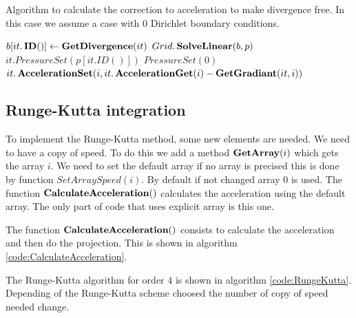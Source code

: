 \begin{algorithm}
\caption{Algorithm to calculate the correction to acceleration to make divergence free.
In this case we assume a case with 0 Dirichlet boundary conditions.}
\label{code:ProjectAcceleration}
\begin{algorithmic}[1]
				\State $b[it.\mathop{\textbf{ID}}()] \gets \mathop{\textbf{GetDivergence}}(it)$
			\EndIf
		\EndFor
		\State $Grid.\mathop{\textbf{SolveLinear}}(b,p)$
				\State $it.PressureSet(p[it.ID()])$
			\Else
				\State $PressureSet(0)$
			\EndIf
		\EndFor
				\State $it.\mathop{\textbf{AccelerationSet}}(i,it.\mathop{\textbf{AccelerationGet}}(i)-\mathop{\textbf{GetGradiant}}(it,i))$
			\EndFor
		\EndFor
\EndProcedure
			 \end{algorithmic}
\end{algorithm}

\subsection{Runge-Kutta integration}
\label{fixed:sec:rungekutta}

To implement the Runge-Kutta method, some new elements are needed.
We need to have a copy of speed. To do this we add a method $\mathop{\textbf{GetArray}}(i)$ which gets the array $i$.
We need to set the default array if no array is precised this is done by function $SetArraySpeed(i)$.
By default if not changed array $0$ is used.
The function $\mathop{\textbf{CalculateAcceleration}}()$ calculates the acceleration using the default array.
The only part of code that uses explicit array is this one.

The function $\mathop{\textbf{CalculateAcceleration}}()$ consists to calculate the acceleration and then do the projection.
This is shown in algorithm \ref{code:CalculateAcceleration}.

The Runge-Kutta algorithm for order $4$ is shown in algorithm \ref{code:RungeKutta}.
Depending of the Runge-Kutta scheme choosed the number of copy of speed needed change.

